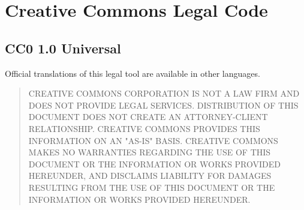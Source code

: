 \section{Creative Commons Legal Code}

\subsection{CC0 1.0 Universal}







Official translations of this legal tool are available in other languages.


\begin{quotation}
CREATIVE COMMONS CORPORATION IS NOT A LAW FIRM AND DOES NOT
PROVIDE LEGAL SERVICES. DISTRIBUTION OF THIS DOCUMENT DOES
NOT CREATE AN ATTORNEY-CLIENT RELATIONSHIP. CREATIVE COMMONS
PROVIDES THIS INFORMATION ON AN "AS-IS" BASIS. CREATIVE
COMMONS MAKES NO WARRANTIES REGARDING THE USE OF THIS
DOCUMENT OR THE INFORMATION OR WORKS PROVIDED HEREUNDER, AND
DISCLAIMS LIABILITY FOR DAMAGES RESULTING FROM THE USE OF
THIS DOCUMENT OR THE INFORMATION OR WORKS PROVIDED
HEREUNDER.
\end{quotation}
